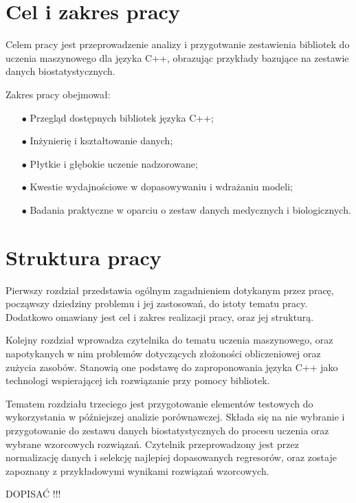 \section{Cel i zakres pracy} %

Celem pracy jest przeprowadzenie analizy i przygotwanie zestawienia bibliotek do uczenia maszynowego dla języka C++, obrazując przykłady bazujące na zestawie danych biostatystycznych.

Zakres pracy obejmował:

\begin{itemize}
    \item [$\bullet$] Przegląd dostępnych bibliotek języka C++;
    \item [$\bullet$] Inżynierię i kształtowanie danych;
    \item [$\bullet$] Płytkie i głębokie uczenie nadzorowane;
    \item [$\bullet$] Kwestie wydajnościowe w dopasowywaniu i wdrażaniu modeli;
    \item [$\bullet$] Badania praktyczne w oparciu o zestaw danych medycznych i biologicznych.
\end{itemize}

\section{Struktura pracy} %

Pierwszy rozdział przedstawia ogólnym zagadnieniem dotykanym przez pracę, począwszy dziedziny problemu i jej zastosowań, do istoty tematu pracy. Dodatkowo omawiany jest cel i zakres realizacji pracy, oraz jej strukturą.

Kolejny rozdział wprowadza czytelnika do tematu uczenia maszynowego, oraz napotykanych w nim problemów dotyczących złożoności obliczeniowej oraz zużycia zasobów. Stanowią one podstawę do zaproponowania języka C++ jako technologi wspierającej ich rozwiązanie przy pomocy bibliotek. 

Tematem rozdziału trzeciego jest przygotowanie elementów testowych do wykorzystania w późniejszej analizie porównawczej. Składa się na nie wybranie i przygotowanie do zestawu danych biostatystycznych do procesu uczenia oraz wybrane wzorcowych rozwiązań. Czytelnik przeprowadzony jest przez normalizację danych i selekcję najlepiej dopasowanych regresorów, oraz zostaje zapoznany z przykładowymi wynikami rozwiązań wzorcowych.

DOPISAĆ !!!